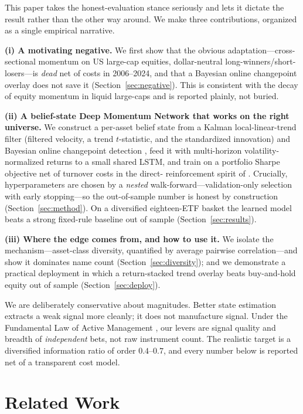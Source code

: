 \documentclass[11pt,a4paper]{article}
\theoremstyle{definition}
\begin{document}
This paper takes the honest-evaluation stance seriously and lets it dictate the result rather than
the other way around. We make three contributions, organized as a single empirical narrative.

\textbf{(i) A motivating negative.} We first show that the obvious adaptation---cross-sectional
momentum on US large-cap equities, dollar-neutral long-winners/short-losers---is \emph{dead} net
of costs in 2006--2024, and that a Bayesian online changepoint overlay does not save it
(Section~\ref{sec:negative}). This is consistent with the decay of equity momentum in liquid
large-caps and is reported plainly, not buried.

\textbf{(ii) A belief-state Deep Momentum Network that works on the right universe.} We construct a
per-asset belief state from a Kalman local-linear-trend filter (filtered velocity, a trend
$t$-statistic, and the standardized innovation) and Bayesian online changepoint detection
\cite{kalman1960,adams2007}, feed it with multi-horizon volatility-normalized returns to a small
shared LSTM, and train on a portfolio Sharpe objective net of turnover costs in the direct-
reinforcement spirit of \cite{moody2001}. Crucially, hyperparameters are chosen by a \emph{nested}
walk-forward---validation-only selection with early stopping---so the out-of-sample number is
honest by construction (Section~\ref{sec:method}). On a diversified eighteen-ETF basket the learned
model beats a strong fixed-rule baseline out of sample (Section~\ref{sec:results}).

\textbf{(iii) Where the edge comes from, and how to use it.} We isolate the mechanism---asset-class
diversity, quantified by average pairwise correlation---and show it dominates name count
(Section~\ref{sec:diversity}); and we demonstrate a practical deployment in which a return-stacked
trend overlay beats buy-and-hold equity out of sample (Section~\ref{sec:deploy}).

We are deliberately conservative about magnitudes. Better state estimation extracts a weak signal
more cleanly; it does not manufacture signal. Under the Fundamental Law of Active Management
\cite{grinold1999}, our levers are signal quality and breadth of \emph{independent} bets, not raw
instrument count. The realistic target is a diversified information ratio of order $0.4$--$0.7$,
and every number below is reported net of a transparent cost model.

\section{Related Work}
\label{sec:related}
\end{document}
